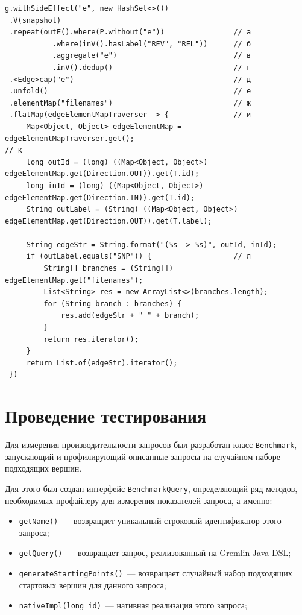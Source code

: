 \documentclass[times,specification,annotation]{itmo-student-thesis}
\begin{document}
\begin{lstlisting}[float=!h,caption={Дерево ревизий снимка на Gremlin},label={lst:snp}]
g.withSideEffect("e", new HashSet<>())
 .V(snapshot)
 .repeat(outE().where(P.without("e"))                // а
           .where(inV().hasLabel("REV", "REL"))      // б
           .aggregate("e")                           // в
           .inV().dedup()                            // г
 .<Edge>cap("e")                                     // д
 .unfold()                                           // е
 .elementMap("filenames")                            // ж
 .flatMap(edgeElementMapTraverser -> {               // и
     Map<Object, Object> edgeElementMap = edgeElementMapTraverser.get();                                       // к
     long outId = (long) ((Map<Object, Object>) edgeElementMap.get(Direction.OUT)).get(T.id);
     long inId = (long) ((Map<Object, Object>) edgeElementMap.get(Direction.IN)).get(T.id);
     String outLabel = (String) ((Map<Object, Object>) edgeElementMap.get(Direction.OUT)).get(T.label);

     String edgeStr = String.format("(%s -> %s)", outId, inId);
     if (outLabel.equals("SNP")) {                   // л
         String[] branches = (String[]) edgeElementMap.get("filenames");
         List<String> res = new ArrayList<>(branches.length);
         for (String branch : branches) {
             res.add(edgeStr + " " + branch);
         }
         return res.iterator();
     }
     return List.of(edgeStr).iterator();
 })
\end{lstlisting}

\section{Проведение тестирования}

Для измерения производительности запросов был разработан класс \texttt{Benchmark}, запускающий и профилирующий описанные запросы на случайном наборе подходящих вершин. 

Для этого был создан интерфейс \texttt{BenchmarkQuery}, определяющий ряд методов, необходимых профайлеру для измерения показателей запроса, а именно:

\begin{itemize}
    \item \texttt{getName()}~--- возвращает уникальный строковый идентификатор этого запроса;
    \item \texttt{getQuery()}~--- возвращает запрос, реализованный на Gremlin-Java DSL;
    \item \texttt{generateStartingPoints()}~--- возвращает случайный набор подходящих стартовых вершин для данного запроса;
    \item \texttt{nativeImpl(long id)}~--- нативная реализация этого запроса;
\end{itemize}
\end{document}

